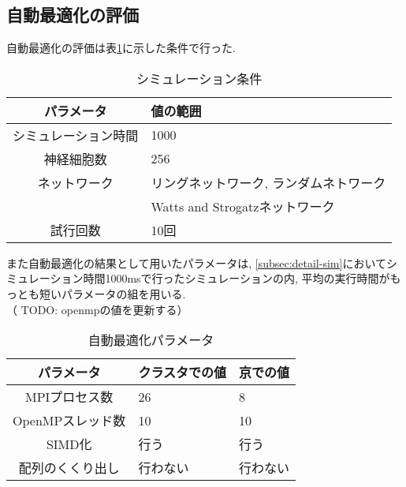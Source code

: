 \subsection{自動最適化の評価}
自動最適化の評価は表\ref{table:sim-cond}に示した条件で行った.\\
\begin{table}[htb]
{\footnotesize
  \caption {シミュレーション条件}
  \begin{center}
    \begin{tabular}{|c|l|}
      \hline
      パラメータ & 値の範囲\\ \hline
      シミュレーション時間 & 1000\\ \hline
      神経細胞数 & 256\\ \hline
      ネットワーク & リングネットワーク, ランダムネトワーク\\
                 & Watts and Strogatzネットワーク\\ \hline
      試行回数 & 10回 \\ \hline
    \end{tabular}
    \label{table:sim-cond}
  \end{center}
}
\end{table}

また自動最適化の結果として用いたパラメータは,
\ref{subsec:detail-sim}においてシミュレーション時間1000msで行ったシミュレーションの内,
平均の実行時間がもっとも短いパラメータの組を用いる.\\
（ TODO: openmpの値を更新する）
\begin{table}[htb]
  \caption {自動最適化パラメータ}
  \begin{center}
    \begin{tabular}{|c|l|l|}
      \hline
      パラメータ & クラスタでの値 & 京での値\\ \hline
      MPIプロセス数 & 26 & 8\\ \hline
      OpenMPスレッド数 & 10 & 10\\ \hline
      SIMD化 & 行う & 行う\\ \hline
      配列のくくり出し & 行わない & 行わない \\ \hline
    \end{tabular}
    \label{table:auto-tuned-param}
  \end{center}
\end{table}
